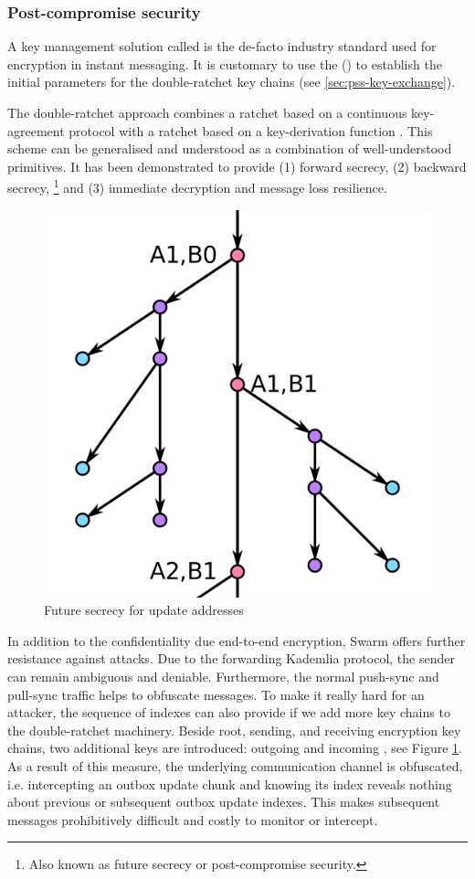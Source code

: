 \subsubsection{Post-compromise security}

A key management solution called  is the de-facto industry standard used for encryption in instant messaging.
It is customary to use the  () to establish the initial parameters for the double-ratchet key chains (see \ref{sec:pss-key-exchange}).

The double-ratchet approach combines a ratchet based on a continuous key-agreement protocol with a ratchet based on a key-derivation function \citep{perrin2016double}. This scheme can be generalised \citep{alwen2019double} and understood as a combination of well-understood primitives. It has been demonstrated to provide  (1) forward secrecy, (2) backward secrecy,%
%
\footnote{Also known as future secrecy or post-compromise security.}
%
and (3) immediate decryption and message loss resilience.


\begin{figure}[htbp]
\centering
\includegraphics[width=.6\textwidth]{fig/double-ratchet.pdf}
\caption[Future secrecy for update addresses \statusorange]{Future secrecy for update addresses}
\label{fig:double-ratchet-for-feeds}
\end{figure}

In addition to the confidentiality due end-to-end encryption, Swarm offers further resistance against attacks. Due to the forwarding Kademlia protocol, the sender can remain ambiguous and deniable. Furthermore, the normal push-sync and pull-sync traffic helps to obfuscate messages. To make it really hard for an attacker, the sequence of indexes can also provide  if we add more key chains to the double-ratchet machinery. Beside root, sending, and receiving encryption key chains, two additional keys are introduced: outgoing and incoming , see Figure \ref{fig:double-ratchet-for-feeds}. As a result of this measure, the underlying communication channel is obfuscated, i.e. intercepting an outbox update chunk and knowing its index reveals nothing about previous or subsequent outbox update indexes. This makes subsequent messages prohibitively difficult and costly to monitor or intercept.

